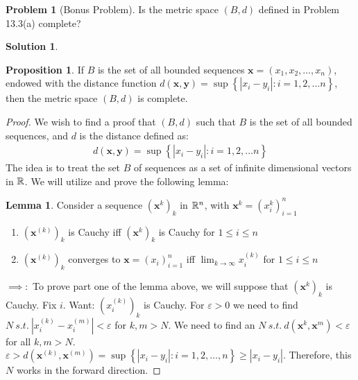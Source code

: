 \documentclass[12pt]{article}
\theoremstyle{definition} %
\newtheorem{solution}{Solution}
\newtheorem*{proposition}{Proposition}
\newtheorem{problem}{Problem}
\newtheorem{lemma}{Lemma}
\theoremstyle{plain} %
\begin{document}
\begin{problem}[Bonus Problem]
    Is the metric space \((B,d)\) defined in Problem 13.3(a) complete?
\end{problem}

\begin{solution}
    \begin{proposition}
        If \(B\) is the set of all bounded sequences \(\mathbf{x} = (x_{1}, x_{2}, \ldots, x_n )\), endowed with the distance function \(d(\mathbf{x}, \mathbf{y})=\sup \left\{ \left\vert x_i - y_{i} \right\vert : i=1,2, \ldots n \right\}\), then the metric space \((B,d)\) is complete.
    \end{proposition}
    \begin{proof}

        We wish to find a proof that \((B, d)\) such that \(B\) is the set of all bounded sequences, and \(d\) is the distance defined as:
        \begin{align}
            d(\mathbf{x}, \mathbf{y})=\sup \left\{ \left\vert x_i - y_{i} \right\vert : i=1,2, \ldots n \right\} 
        \end{align} 
        The idea is to treat the set \(B\) of sequences as a set of infinite dimensional vectors in \(\mathbb{\MakeUppercase{R}} \). 
        We will utilize and prove the following lemma: 
        \begin{lemma}
                Consider a sequence \((\mathbf{x}^{k})_k\) in \(\mathbb{\MakeUppercase{r}}^n\), with \(\mathbf{x}^{k}=(x_i^{k})^{n}_{i=1}\)   
            \begin{enumerate}
                \item \((\textbf{x}^{(k)})_{k}\) is Cauchy iff \((\textbf{x}^{k})_{k}\)  is Cauchy for \(1 \leq i \leq n \)
                \item \((\textbf{x}^{(k)})_{k}\) converges to \(\mathbf{x} = (x_{i})^{n}_{i=1}\) iff \(\lim_{k \to \infty} x_{i}^{(k)}\) for \(1 \leq i \leq n \) 
            \end{enumerate} 
        \end{lemma}
        \noindent
       \(\implies :\)  To prove part one of the lemma above, we will suppose that \((\textbf{x}^{k})_{k}\) is Cauchy. Fix \(i\). Want: \((x_{i}^{(k)})_{k}\) is Cauchy. For \(\varepsilon > 0\) we need to find \(N\ s.t. \ \left\vert x_{i}^{(k)} - x_{i}^{(m)} \right\vert <\varepsilon \) for \(k, m>N\). We need to find an \(N\ s.t. \ d(\mathbf{x}^{k}, \mathbf{x}^{m})<\varepsilon\) for all \(k,m>N\). \(\varepsilon > d(\mathbf{x}^{(k)}, \mathbf{x}^{(m)})=\sup \left\{ \left\vert  x_{i}- y_{i}\right\vert : i= 1,2, \ldots , n   \right\} \geq \left\vert x_{i}-y_{i} \right\vert \). Therefore, this \(N\) works in the forward direction.

\end{proof}
\end{solution}
\end{document}
